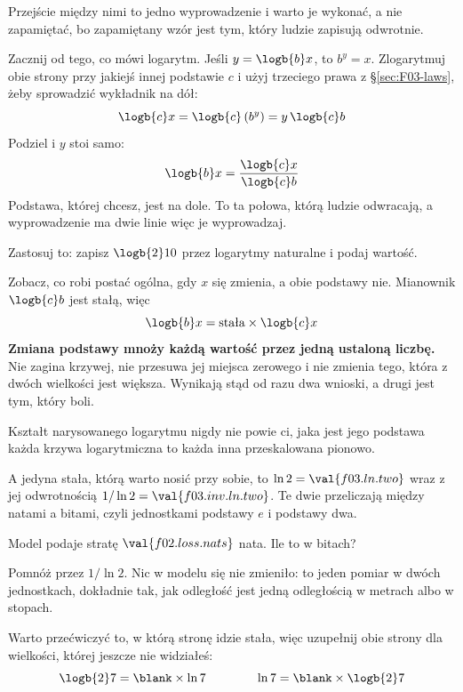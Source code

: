 \begin{fr}
Przejście między nimi to jedno wyprowadzenie i warto je wykonać, a nie
zapamiętać, bo zapamiętany wzór jest tym, który ludzie zapisują odwrotnie.

Zacznij od tego, co mówi logarytm. Jeśli $y = \logb{b} x$, to $b^{y} = x$.
Zlogarytmuj obie strony przy jakiejś innej podstawie $c$ i użyj trzeciego prawa
z \S\ref{sec:F03-laws}, żeby sprowadzić wykładnik na dół:
\[ \logb{c} x = \logb{c} \left(b^{y}\right) = y \, \logb{c} b \]
Podziel i $y$ stoi samo:
\[ \logb{b} x = \frac{\logb{c} x}{\logb{c} b} \]
Podstawa, której chcesz, jest na dole. To ta połowa, którą ludzie odwracają, a
wyprowadzenie ma dwie linie \dash{} więc je wyprowadzaj.

Zastosuj to: zapisz $\logb{2} 10$ przez logarytmy naturalne i podaj wartość.
\nextframe
\end{fr}

\begin{fr}
Zobacz, co robi postać ogólna, gdy $x$ się zmienia, a obie podstawy nie.
Mianownik $\logb{c} b$ jest stałą, więc
\[ \logb{b} x = \text{stała} \times \logb{c} x \]
\textbf{Zmiana podstawy mnoży każdą wartość przez jedną ustaloną liczbę.} Nie
zagina krzywej, nie przesuwa jej miejsca zerowego i nie zmienia tego, która z
dwóch wielkości jest większa. Wynikają stąd od razu dwa wnioski, a drugi jest
tym, który boli.

Kształt narysowanego logarytmu nigdy nie powie ci, jaka jest jego podstawa
\dash{} każda krzywa logarytmiczna to każda inna przeskalowana pionowo.

A jedyna stała, którą warto nosić przy sobie, to $\ln 2 = \val{f03.ln.two}$
wraz z jej odwrotnością $1 / \ln 2 = \val{f03.inv.ln.two}$. Te dwie przeliczają
między natami a bitami, czyli jednostkami podstawy $e$ i podstawy dwa.

Model podaje stratę $\val{f02.loss.nats}$ nata. Ile to w bitach?
\nextframe
\end{fr}

\begin{fr}
Pomnóż przez $1/\ln 2$. Nic w modelu się nie zmieniło: to jeden pomiar w dwóch
jednostkach, dokładnie tak, jak odległość jest jedną odległością w metrach albo
w stopach.

Warto przećwiczyć to, w którą stronę idzie stała, więc uzupełnij obie strony
dla wielkości, której jeszcze nie widziałeś:
\[ \logb{2} 7 = \blank \times \ln 7 \qquad\qquad
   \ln 7 = \blank \times \logb{2} 7 \]
\dotline
\nextframe
\end{fr}

